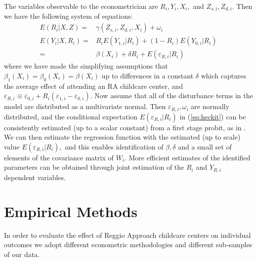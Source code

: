 \documentclass[12pt]{article}
\begin{document}
\bigskip

The variables observable to the econometrician are $R_{i},Y_{i},X_{i},$ and $Z_{s,i},Z_{d,i}$. Then we have the following system of equations:%
\begin{align}
E(R_{i}|X,Z)        =&  \gamma \left( Z_{s,i}, Z_{d,i}, X_{i} \right) + \omega_{i}  \label{eq:1stage} \\
E(Y_{i} |X,R_{i})   =& R_{i} E(Y_{1,i}| R_{i}) + (1-R_{i}) E(Y_{0,i}| R_{i}) \nonumber \\
   =& \beta(X_{i}) + \delta R_{i} + E(\varepsilon_{R,i}| R_{i}) \label{eq:heckit}
\end{align}
where we have made the simplifying assumptions that $\beta_{1}(X_{i})=\beta_{0}(X_{i})=\beta(X_{i})$ up to differences in a constant $\delta$ which captures the average effect of attending an RA childcare center, and $\varepsilon_{R,i} \equiv \varepsilon_{0,i} +R_{i} (\varepsilon_{1,i}-\varepsilon_{0,i})$.
Now assume that all of the disturbance terms in the model are distributed as a multivariate normal. Then $\varepsilon_{R,i}, \omega_{i}$ are normally distributed, and the conditional expectation $E(\varepsilon_{R,i}|R_{i})$ in (\ref{eq:heckit}) can be consistently estimated (up to a scalar constant) from a first stage probit, as in \cite{Heckman1979}. We can then estimate the regression function with the estimated (up to scale) value $E(\varepsilon_{R,i}|R_{i}),$ and this enables identification of $\beta,\delta$ and a small set of elements of the covariance matrix of $W_{i}.$ More efficient estimates of the identified parameters can be obtained through joint estimation of the $R_{i}$ and $Y_{R,i}$ dependent variables.

%

\section{Empirical Methods} \label{sec:method}

In order to evaluate the effect of Reggio Approach childcare centers on individual outcomes we adopt different econometric methodologies and different sub-samples of our data.
\end{document}

